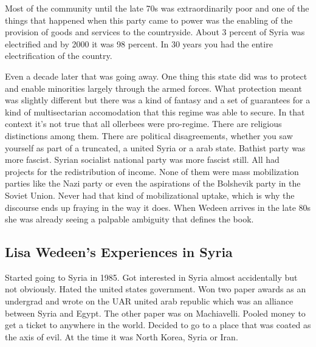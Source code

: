 \documentclass{article}
\begin{document}
\vspace{5mm}

Most of the community until the late 70s was extraordinarily poor and one of the things that happened when this party came to power was the enabling of the provision of goods and services to the countryside.  About 3 percent of Syria was electrified and by 2000 it was 98 percent.  In 30 years you had the entire electrification of the country.  

\vspace{5mm}

Even a decade later that was going away.  One thing this state did was to protect and enable minorities largely through the armed forces.  What protection meant was slightly different but there was a kind of fantasy and a set of guarantees for a kind of multisectarian accomodation that this regime was able to secure.  In that context it's not true that all ollerbees were pro-regime.  There are religious distinctions among them.  There are political disagreements, whether you saw yourself as part of a truncated, a united Syria or a arab state.  Bathist party was more fascist.  Syrian socialist national party was more fascist still.  All had projects for the redistribution of income.  None of them were mass mobilization parties like the Nazi party or even the aspirations of the Bolshevik party in the Soviet Union.  Never had that kind of mobilizational uptake, which is why the discourse ends up fraying in the way it does.  When Wedeen arrives in the late 80s she was already seeing a palpable ambiguity that defines the book.  

\vspace{5mm}

\subsection{Lisa Wedeen's Experiences in Syria}

Started going to Syria in 1985.  Got interested in Syria almost accidentally but not obviously.  Hated the united states government.  Won two paper awards as an undergrad and wrote on the UAR united arab republic which was an alliance between Syria and Egypt.  The other paper was on Machiavelli.  Pooled money to get a ticket to anywhere in the world.  Decided to go to a place that was coated as the axis of evil.  At the time it was North Korea, Syria or Iran.  

\vspace{5mm}
\end{document}
